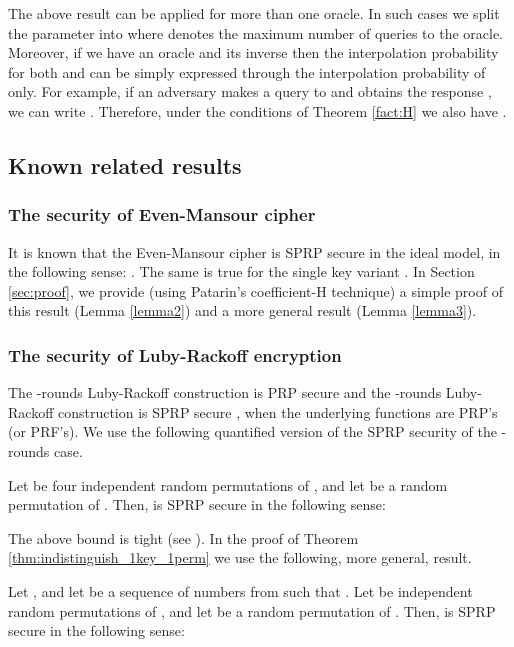 \documentclass{llncs}
\begin{document}
The above result can be applied for more than one oracle. In such cases we split the parameter  into  where  denotes the maximum number of queries to the  oracle. Moreover, if we have an oracle  and its inverse  then the interpolation probability for both  and  can be simply expressed through the interpolation probability of  only. For example, if an adversary makes a query  to  and obtains the response , we can write .
Therefore, under the conditions of Theorem \ref{fact:H} we also have .

\subsection{Known related results}\label{subsection3_2}

\subsubsection{The security of Even-Mansour cipher} 
It is known that the Even-Mansour cipher  is SPRP secure in the ideal model, in the following sense:  . The same is true for the single key variant .
In Section \ref{sec:proof}, we provide (using Patarin's coefficient-H technique) a simple proof of this result (Lemma \ref{lemma2}) and a more general result (Lemma \ref{lemma3}).

\subsubsection{The security of Luby-Rackoff encryption}
The -rounds Luby-Rackoff construction is PRP secure and the -rounds Luby-Rackoff construction is SPRP secure ,
when the underlying functions  are PRP's (or PRF's).
We use the following quantified version of the SPRP security of the -rounds case.
\begin{theorem}
\label{Piret}
Let  be four independent random permutations of
, and let  be a random permutation of .
Then,  is SPRP  secure in the following sense:

\end{theorem}

The above bound  is tight (see \cite{TP}).
In the proof of Theorem \ref{thm:indistinguish_1key_1perm} we use the following, more general, result.
\begin{theorem}
\label{Nandi}
Let , and let   be a sequence of numbers from  such that . Let  be  independent random permutations of , and let  be a random permutation of . Then,  is  SPRP  secure in the following sense:

\end{theorem}
\end{document}
